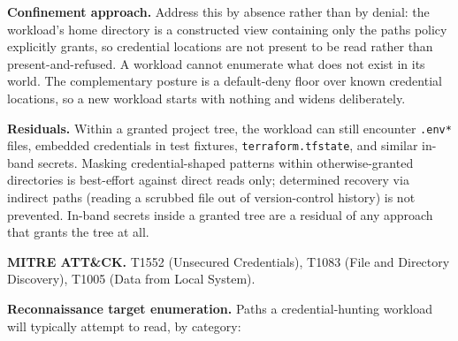 \textbf{Confinement approach.} Address this by absence rather than by
denial: the workload's home directory is a constructed view containing
only the paths policy explicitly grants, so credential locations are not
present to be read rather than present-and-refused. A workload cannot
enumerate what does not exist in its world. The complementary posture is
a default-deny floor over known credential locations, so a new workload
starts with nothing and widens deliberately.

\textbf{Residuals.} Within a granted project tree, the workload can
still encounter \texttt{.env*} files, embedded credentials in test
fixtures, \texttt{terraform.tfstate}, and similar in-band secrets.
Masking credential-shaped patterns within otherwise-granted directories
is best-effort against direct reads only; determined recovery via
indirect paths (reading a scrubbed file out of version-control history)
is not prevented. In-band secrets inside a granted tree are a residual
of any approach that grants the tree at all.

\textbf{MITRE ATT\&CK.} T1552 (Unsecured Credentials), T1083 (File and
Directory Discovery), T1005 (Data from Local System).

\textbf{Reconnaissance target enumeration.} Paths a credential-hunting
workload will typically attempt to read, by category:

